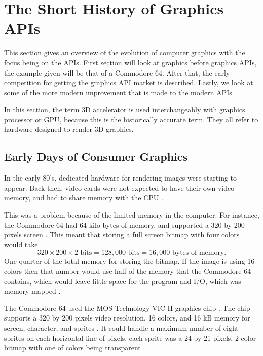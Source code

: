 \section{The Short History of Graphics \acs{API}s}\label{sec:short_history}
\begin{sectionmeta}
	This section gives an overview of the evolution of computer graphics with the focus being on the \glspl{API}.
	First section will look at graphics before graphics \glspl{API}, the example given will be that of a Commodore 64.
	After that, the early competition for getting the graphics \gls{API} market is described.
	Lastly, we look at some of the more modern improvement that is made to the modern \glspl{API}.
	
	In this section, the term 3D accelerator is used interchangeably with graphics processor or \gls{GPU}, because this is the historically accurate term. 
	They all refer to hardware designed to render 3D graphics.
\end{sectionmeta}

\subsection{Early Days of Consumer Graphics}

In the early 80's, dedicated hardware for rendering images were starting to appear.
Back then, video cards were not expected to have their own video memory, and had to share memory with the \gls{CPU} \cite{wikipedia????shared}.

This was a problem because of the limited memory in the computer.
For instance, the Commodore 64 had 64 kilo bytes of memory, and supported a 320 by 200 pixels screen \cite{commodore1983commodore}.
This meant that storing a full screen bitmap with four colors would take $$320\times 200\times 2 \text{ bits} = 128,000 \text{ bits} = 16,000 \text{ bytes of memory.}$$
One quarter of the total memory for storing the bitmap.
If the image is using 16 colors then that number would use half of the memory that the Commodore 64 contains, which would leave little space for the program and I/O, which was memory mapped \cite{commodore1983commodore}.

The Commodore 64 used the MOS Technology VIC-II graphics chip \cite{commodore1983commodore}.
The chip supports a 320 by 200 pixels video resolution, 16 colors, and 16 kB memory for screen, character, and sprites \cite{commodore1983commodore}.
It could handle a maximum number of eight sprites on each horizontal line of pixels, each sprite was a 24 by 21 pixels, 2 color bitmap with one of colors being transparent \cite{commodore1983commodore}.

